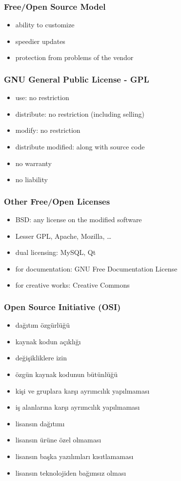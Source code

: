 \documentclass[dvipsnames]{beamer}
\theoremstyle{plain}
\begin{document}
\begin{frame}
  \frametitle{Free/Open Source Model}

  \begin{itemize}
    \item ability to customize
    \item speedier updates
    \item protection from problems of the vendor
  \end{itemize}
\end{frame}

\begin{frame}
  \frametitle{GNU General Public License - GPL}

  \begin{itemize}
    \item use: no restriction
    \item distribute: no restriction (including selling)
    \item modify: no restriction
    \item distribute modified: along with source code
    \item no warranty
    \item no liability
  \end{itemize}
\end{frame}

\begin{frame}
  \frametitle{Other Free/Open Licenses}

  \begin{itemize}
    \item BSD: any license on the modified software
    \item Lesser GPL, Apache, Mozilla, \ldots
    \item dual licensing: MySQL, Qt

    \pause
    \medskip
    \item for documentation: GNU Free Documentation License
    \item for creative works: Creative Commons
  \end{itemize}
\end{frame}

\begin{frame}
  \frametitle{Open Source Initiative (OSI)}

  \begin{itemize}
    \item dağıtım özgürlüğü
    \item kaynak kodun açıklığı
    \item değişikliklere izin
    \item özgün kaynak kodunun bütünlüğü
    \item kişi ve gruplara karşı ayrımcılık yapılmaması
    \item iş alanlarına karşı ayrımcılık yapılmaması
    \item lisansın dağıtımı
    \item lisansın ürüne özel olmaması
    \item lisansın başka yazılımları kısıtlamaması
    \item lisansın teknolojiden bağımsız olması
  \end{itemize}
\end{frame}
\end{document}
